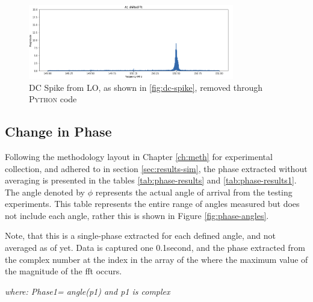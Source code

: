 \documentclass[class=report,11pt,crop=false]{standalone}
\begin{document}
\begin{figure}[!h]
    \centering
    \includegraphics[width=0.8\textwidth]{Images/plots/dcspike-remove.png}
    \caption{DC Spike from LO, as shown in \ref{fig:dc-spike}, removed through \textsc{Python} code}
    \label{fig:dc-spike-remove}
\end{figure}


\subsection{Change in Phase}
Following the methodology layout in Chapter \ref{ch:meth} for experimental collection, and adhered to in section \ref{sec:results-sim}, the phase extracted without averaging is presented in the tables \ref{tab:phase-results} and \ref{tab:phase-results1}. The angle denoted by  $\phi$ represents the actual angle of arrival from the testing experiments. This table represents the entire range of angles measured but does not include each angle, rather this is shown in Figure \ref{fig:phase-angles}.

Note, that this is a single-phase extracted for each defined angle, and not averaged as of yet. Data is captured one 0.1second, and the phase extracted from the complex number at the index in the array of the where the maximum value of the magnitude of the \gls{fft} occurs.

\centerline{\emph{where: Phase1= angle(p1) and p1 is complex}}
\vspace{0.5cm}
\end{document}
